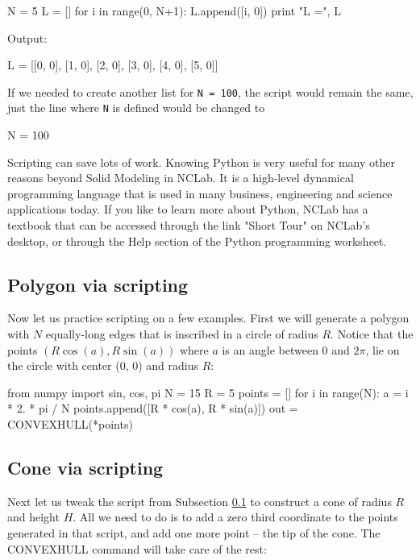 \begin{bluecode}
N = 5
L = []
for i in range(0, N+1):
    L.append([i, 0])
print "L =", L
\end{bluecode}
Output:
\begin{bluecode}
L = [[0, 0], [1, 0], [2, 0], [3, 0], [4, 0], [5, 0]]
\end{bluecode}
If we needed to create another list for {\tt N = 100}, the script would remain the same,
just the line where {\tt N} is defined would be changed to 

\begin{bluecode}
N = 100
\end{bluecode}
Scripting can save lots of work. Knowing Python is very useful for many other
reasons beyond Solid Modeling in NCLab. It is a high-level dynamical programming 
language that is used in many business, engineering and science applications 
today. If you like to learn more about Python, NCLab has a textbook that can be 
accessed through the link "Short Tour" on NCLab's desktop, or through the Help
section of the Python programming worksheet. 

\subsection{Polygon via scripting}\label{subsec:polygon}

Now let us practice scripting on a few examples.
First we will generate a polygon with $N$ equally-long 
edges that is inscribed in 
a circle of radius $R$. Notice that the points
$(R  \cos(a), R  \sin(a))$ where $a$ is an angle between 
$0$ and $2\pi$, lie on the circle with center (0, 0) and 
radius $R$:

\begin{bluecode}
from numpy import sin, cos, pi
N = 15
R = 5
points = []
for i in range(N):
    a = i * 2. * pi / N
    points.append([R * cos(a), R * sin(a)])
out = CONVEXHULL(*points)
\end{bluecode}

\subsection{Cone via scripting}\label{par:cocon}

Next let us tweak the script
from Subsection \ref{subsec:polygon} to construct a cone of radius
$R$ and height $H$. All we need to do is to add a zero third coordinate 
to the points generated in that script, and add one more point -- the 
tip of the cone. The CONVEXHULL command will take care of the rest:

